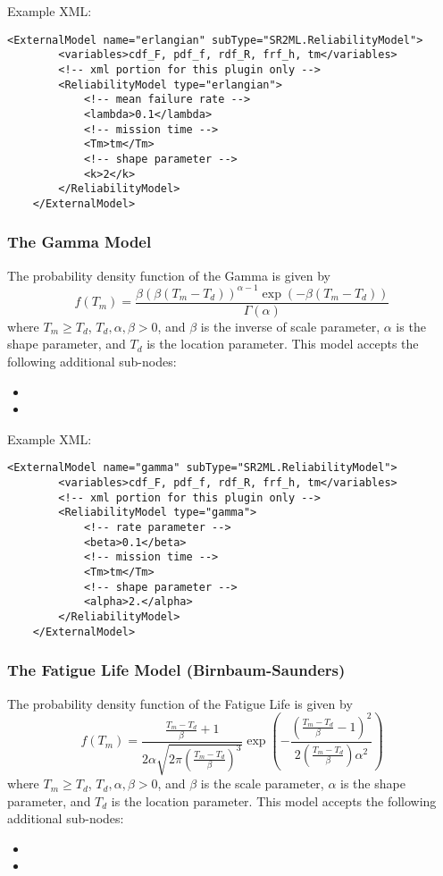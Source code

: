 Example XML:
\begin{lstlisting}[style=XML]
	<ExternalModel name="erlangian" subType="SR2ML.ReliabilityModel">
		<variables>cdf_F, pdf_f, rdf_R, frf_h, tm</variables>
		<!-- xml portion for this plugin only -->
		<ReliabilityModel type="erlangian">
			<!-- mean failure rate -->
			<lambda>0.1</lambda>
			<!-- mission time -->
			<Tm>tm</Tm>
			<!-- shape parameter -->
			<k>2</k>
		</ReliabilityModel>
	</ExternalModel>
\end{lstlisting}


\subsubsection{The Gamma Model}
The probability density function of the Gamma is given by
\begin{equation}
	f(T_m) = \frac{\beta \left(\beta \left(T_m-T_d\right)\right)^{\alpha-1}\exp\left(-\beta\left(T_m-T_d\right)\right)}{\Gamma \left(\alpha\right)}
\end{equation}
where $T_m\geq T_d$, $T_d, \alpha, \beta >0$, and $\beta$ is the inverse of scale parameter, $\alpha$ is the shape
parameter, and $T_d$ is the location parameter.
This model accepts the following additional sub-nodes:
\begin{itemize}
	\item {}
	\item {}
\end{itemize}

Example XML:
\begin{lstlisting}[style=XML]
	<ExternalModel name="gamma" subType="SR2ML.ReliabilityModel">
		<variables>cdf_F, pdf_f, rdf_R, frf_h, tm</variables>
		<!-- xml portion for this plugin only -->
		<ReliabilityModel type="gamma">
			<!-- rate parameter -->
			<beta>0.1</beta>
			<!-- mission time -->
			<Tm>tm</Tm>
			<!-- shape parameter -->
			<alpha>2.</alpha>
		</ReliabilityModel>
	</ExternalModel>
\end{lstlisting}


\subsubsection{The Fatigue Life Model (Birnbaum-Saunders)}
The probability density function of the Fatigue Life is given by
\begin{equation}
	f(T_m) = \frac{\frac{T_m-T_d}{\beta}+1}{2\alpha\sqrt{2\pi\left(\frac{T_m-T_d}{\beta}\right)^3}}
				 \exp\left(-\frac{\left(\frac{T_m-T_d}{\beta}-1\right)^2}{2\left(\frac{T_m-T_d}{\beta}\right)\alpha^2}\right)
\end{equation}
where $T_m\geq T_d$, $T_d, \alpha, \beta >0$, and $\beta$ is the scale parameter, $\alpha$ is the shape
parameter, and $T_d$ is the location parameter.
This model accepts the following additional sub-nodes:
\begin{itemize}
	\item {}
	\item {}
\end{itemize}

